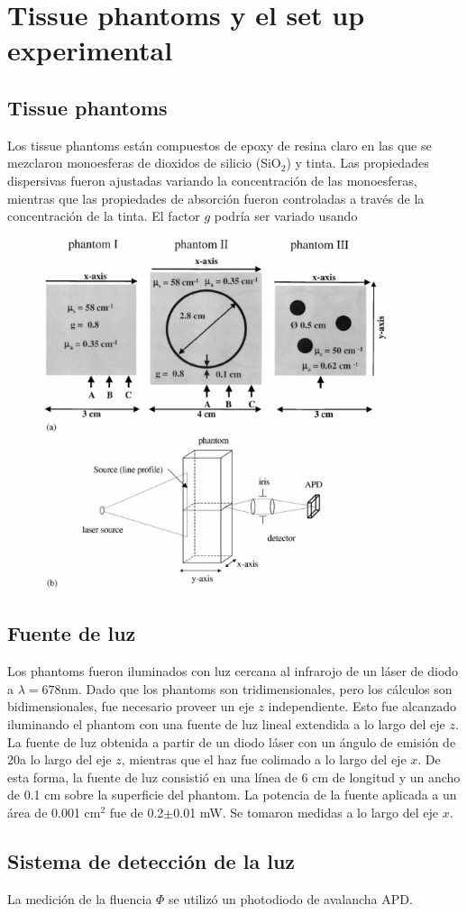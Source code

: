 \documentclass[a4paper,10pt]{article}
\begin{document}
\section{Tissue phantoms y el set up experimental}

\subsection{Tissue phantoms}

Los tissue phantoms están compuestos de epoxy de resina claro en las que
se mezclaron monoesferas de dioxidos de silicio (SiO$_2$) y tinta. Las 
propiedades dispersivas fueron ajustadas variando la concentración de las
monoesferas, mientras que las propiedades de absorción fueron controladas
a través de la concentración de la tinta. El factor $g$ podría ser variado 
usando 

\begin{figure}
 \includegraphics[width=0.9\textwidth]{fig1.eps}
\end{figure}


\subsection{Fuente de luz}

Los phantoms fueron iluminados con luz cercana al infrarojo de un láser
de diodo a $\lambda=678$nm. Dado que los phantoms son tridimensionales,
pero los cálculos son bidimensionales, fue necesario proveer un eje $z$
independiente. Esto fue alcanzado iluminando el phantom con una fuente 
de luz lineal extendida a lo largo del eje $z$. La fuente de luz obtenida 
a partir de un diodo láser con un ángulo de emisión de 20\textdegree a lo 
largo del eje $z$, mientras que el haz fue colimado a lo largo del eje 
$x$. De esta forma, la fuente de luz consistió en una línea de 6 cm de 
longitud y un ancho de 0.1 cm sobre la superficie del phantom. La potencia
de la fuente aplicada a un área de 0.001 cm$^2$ fue de 0.2$\pm$0.01 mW. 
Se tomaron medidas a lo largo del eje $x$.



\subsection{Sistema de detección de la luz}
La medición de la fluencia $\Phi$ se utilizó un photodiodo de avalancha
APD.
\end{document}
